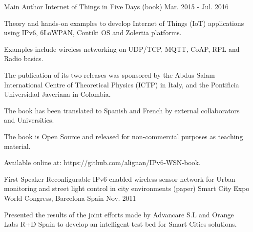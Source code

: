 

\begin{cventries}

  \cventry
    {Main Author} %
    {Internet of Things in Five Days (book)} %
    {} %
    {Mar. 2015 - Jul. 2016} %
    {
      \begin{cvitems} %
        \item {Theory and hands-on examples to develop Internet of Things (IoT) applications using IPv6, 6LoWPAN, Contiki OS and Zolertia platforms.}
        \item {Examples include wireless networking on UDP/TCP, MQTT, CoAP, RPL and Radio basics.}
        \item {The publication of its two releases was sponsored by the Abdus Salam International Centre of Theoretical Physics (ICTP) in Italy, and the Pontificia Universidad Javeriana in Colombia.}
        \item {The book has been translated to Spanish and French by external collaborators and Universities.}
        \item {The book is Open Source and released for non-commercial purposes as teaching material.}
        \item {Available online at: https://github.com/alignan/IPv6-WSN-book.}
      \end{cvitems}
    }

  \cventry
    {First Speaker} %
    {Reconfigurable IPv6-enabled wireless sensor network for Urban monitoring and street light control in city environments (paper)} %
    {Smart City Expo World Congress, Barcelona-Spain} %
    {Nov. 2011} %
    {
      \begin{cvitems} %
        \item {Presented the results of the joint efforts made by Advancare S.L and Orange Labs R+D Spain to develop an intelligent test bed for Smart Cities solutions.}
      \end{cvitems}
    }

\end{cventries}
